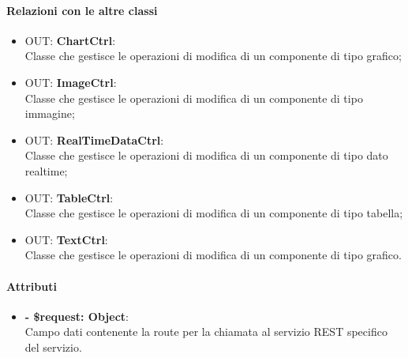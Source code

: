 	\paragraph{Relazioni con le altre classi}
	\begin{itemize}
		\item OUT: \textbf{ChartCtrl}:\\
			Classe che gestisce le operazioni di modifica di un componente di tipo grafico;
		\item OUT: \textbf{ImageCtrl}:\\
			Classe che gestisce le operazioni di modifica di un componente di tipo immagine;
		\item OUT: \textbf{RealTimeDataCtrl}:\\
			Classe che gestisce le operazioni di modifica di un componente di tipo dato realtime;
		\item OUT: \textbf{TableCtrl}:\\
			Classe che gestisce le operazioni di modifica di un componente di tipo tabella;
		\item OUT: \textbf{TextCtrl}:\\
			Classe che gestisce le operazioni di modifica di un componente di tipo grafico.
	\end{itemize}
	
	\paragraph{Attributi}
	\begin{itemize}
		\item \textbf{- \$request: Object}:\\
		Campo dati contenente la route per la chiamata al servizio \gls{REST} specifico del servizio.
	\end{itemize}	
	
